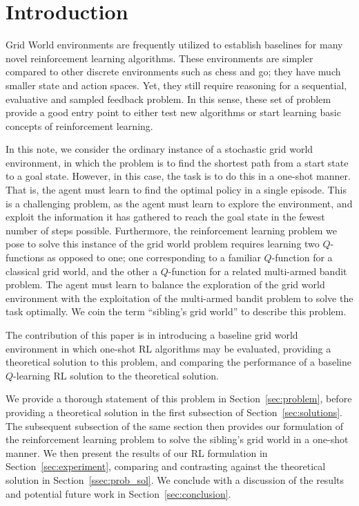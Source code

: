 \section{Introduction}
\label{sec:intro}
%
Grid World environments are frequently utilized to establish baselines for many
novel reinforcement learning algorithms. These environments are simpler compared
to other discrete environments such as chess and go; they have much smaller
state and action spaces. Yet, they still require reasoning for a sequential,
evaluative and sampled feedback problem. In this sense, these set of problem
provide a good entry point to either test new algorithms or start learning basic
concepts of reinforcement learning.

In this note, we consider the ordinary instance of a stochastic grid world
environment, in which the problem is to find the shortest path from a start
state to a goal state. However, in this case, the task is to do this in a
one-shot manner. That is, the agent must learn to find the optimal policy in a
single episode. This is a challenging problem, as the agent must learn to
explore the environment, and exploit the information it has gathered to reach
the goal state in the fewest number of steps possible. Furthermore, the
reinforcement learning problem we pose to solve this instance of the grid world
problem requires learning two $Q$-functions as opposed to one; one corresponding
to a familiar $Q$-function for a classical grid world, and the other a
$Q$-function for a related multi-armed bandit problem. The agent must learn to
balance the exploration of the grid world environment with the exploitation of
the multi-armed bandit problem to solve the task optimally. We coin the term 
``sibling's grid world'' to describe this problem.

The contribution of this paper is in introducing a baseline grid world
environment in which one-shot RL algorithms may be evaluated, providing a 
theoretical solution to this problem, and comparing the performance of a 
baseline $Q$-learning RL solution to the theoretical solution.

We provide a thorough statement of this problem in Section~\ref{sec:problem},
before providing a theoretical solution in the first subsection of
Section~\ref{sec:solutions}. The subsequent subsection of the same section then
provides our formulation of the reinforcement learning problem to solve the
sibling's grid world in a one-shot manner. We then present the results of our RL
formulation in Section~\ref{sec:experiment}, comparing and contrasting against 
the theoretical solution in Section~\ref{ssec:prob_sol}. We conclude with a
discussion of the results and potential future work in Section~\ref{sec:conclusion}.